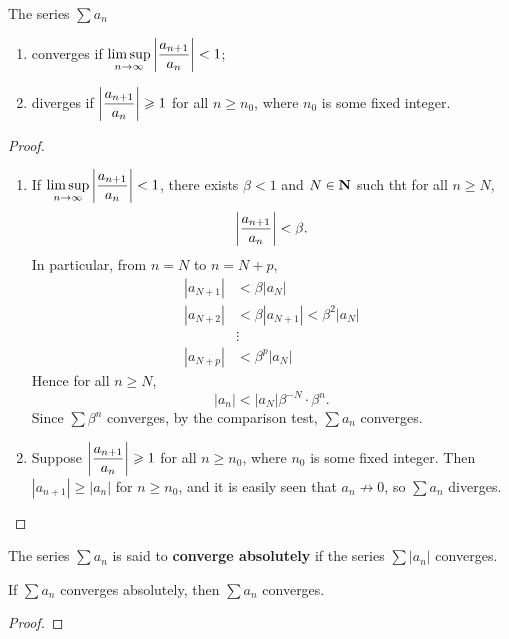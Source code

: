 \begin{lemma}\label{lemma:ratio-test}
The series $\sum a_n$
\begin{enumerate}[label=(\roman*)]
\item converges if $\displaystyle\limsup_{n\to\infty}\left|\frac{a_{n+1}}{a_n}\right|<1$;
\item diverges if $\displaystyle\left|\frac{a_{n+1}}{a_n}\right|\geqslant1$ for all $n\ge n_0$, where $n_0$ is some fixed integer.
\end{enumerate}
\end{lemma}

\begin{proof} \
\begin{enumerate}[label=(\roman*)]
\item If $\displaystyle\limsup_{n\to\infty}\left|\frac{a_{n+1}}{a_n}\right|<1$, there exists $\beta<1$ and $N\in\mathbf N$ such tht for all $n\ge N$,
\[\left|\frac{a_{n+1}}{a_n}\right|<\beta.\]
In particular, from $n=N$ to $n=N+p$,
\begin{align*}
|a_{N+1}|&<\beta|a_N|\\
|a_{N+2}|&<\beta|a_{N+1}|<\beta^2|a_N|\\
&\vdots\\
|a_{N+p}|&<\beta^p|a_N|
\end{align*}
Hence for all $n\ge N$,
\[|a_n|<|a_N|\beta^{-N}\cdot\beta^n.\]
Since $\sum\beta^n$ converges, by the comparison test, $\sum a_n$ converges.
\item Suppose $\displaystyle\left|\frac{a_{n+1}}{a_n}\right|\geqslant1$ for all $n\ge n_0$, where $n_0$ is some fixed integer. Then $|a_{n+1}|\ge|a_n|$ for $n\ge n_0$, and it is easily seen that $a_n\not\to0$, so $\sum a_n$ diverges.
\end{enumerate}
\end{proof}

The series $\sum a_n$ is said to \textbf{converge absolutely} if the series $\sum|a_n|$ converges.

\begin{lemma}\label{lemma:absolute-convergence}
If $\sum a_n$ converges absolutely, then $\sum a_n$ converges.
\end{lemma}

\begin{proof}

\end{proof}

